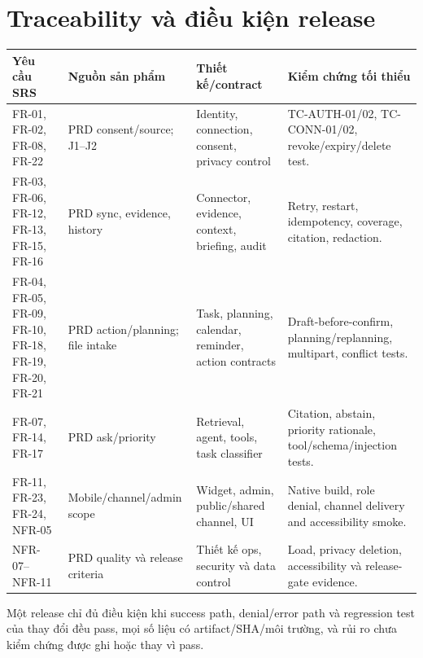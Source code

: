 \documentclass[12pt,a4paper]{article}
\begin{document}
\section{Traceability và điều kiện release}
\small
\begin{longtable}{P{2cm}P{3.3cm}P{3.4cm}P{4.6cm}}
\toprule Yêu cầu SRS & Nguồn sản phẩm & Thiết kế/contract & Kiểm chứng tối thiểu \\ \midrule\endhead
FR-01, FR-02, FR-08, FR-22 & PRD consent/source; J1--J2 & Identity, connection, consent, privacy control & TC-AUTH-01/02, TC-CONN-01/02, revoke/expiry/delete test. \\
FR-03, FR-06, FR-12, FR-13, FR-15, FR-16 & PRD sync, evidence, history & Connector, evidence, context, briefing, audit & Retry, restart, idempotency, coverage, citation, redaction. \\
FR-04, FR-05, FR-09, FR-10, FR-18, FR-19, FR-20, FR-21 & PRD action/planning; file intake & Task, planning, calendar, reminder, action contracts & Draft-before-confirm, planning/replanning, multipart, conflict tests. \\
FR-07, FR-14, FR-17 & PRD ask/priority & Retrieval, agent, tools, task classifier & Citation, abstain, priority rationale, tool/schema/injection tests. \\
FR-11, FR-23, FR-24, NFR-05 & Mobile/channel/admin scope & Widget, admin, public/shared channel, UI & Native build, role denial, channel delivery and accessibility smoke. \\
NFR-07--NFR-11 & PRD quality và release criteria & Thiết kế ops, security và data control & Load, privacy deletion, accessibility và release-gate evidence. \\
\bottomrule
\end{longtable}
Một release chỉ đủ điều kiện khi success path, denial/error path và regression test của thay đổi đều pass, mọi số liệu có artifact/SHA/môi trường, và rủi ro chưa kiểm chứng được ghi  hoặc  thay vì pass.
\end{document}
